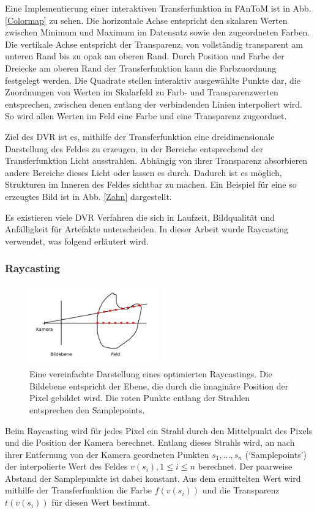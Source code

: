 \documentclass[a4paper,fontsize=12pt,toc=bib,halfparskip]{scrartcl}
\begin{document}
Eine Implementierung einer interaktiven Transferfunktion in FAnToM ist in Abb. \ref{Colormap} zu sehen. Die horizontale Achse entspricht den skalaren Werten zwischen Minimum und Maximum im Datensatz sowie den zugeordneten Farben. Die vertikale Achse entspricht der Transparenz, von vollst\"andig transparent am unteren Rand bis zu opak am oberen Rand. Durch Position und Farbe der Dreiecke am oberen Rand der Transferfunktion kann die Farbzuordnung festgelegt werden. Die Quadrate stellen interaktiv ausgew\"ahlte Punkte dar, die Zuordnungen von Werten im Skalarfeld zu Farb- und Transparenzwerten entsprechen, zwischen denen entlang der verbindenden Linien interpoliert wird. So wird allen Werten im Feld eine Farbe und eine Transparenz zugeordnet. 

Ziel des DVR ist es, mithilfe der Transferfunktion eine dreidimensionale Darstellung des Feldes zu erzeugen, in der Bereiche entsprechend der Transferfunktion Licht ausstrahlen. Abh\"angig von ihrer Transparenz absorbieren andere Bereiche dieses Licht oder lassen es durch. Dadurch ist es m\"oglich, Strukturen im Inneren des Feldes sichtbar zu machen. Ein Beispiel f\"ur eine so erzeugtes Bild ist in Abb. \ref{Zahn} dargestellt.

Es existieren viele DVR Verfahren die sich in Laufzeit, Bildqualit\"at und Anf\"alligkeit f\"ur Artefakte unterscheiden. In dieser Arbeit wurde Raycasting verwendet, was folgend erl\"autert wird.

\subsubsection{Raycasting}
\label{sec:Raycasting}
\begin{figure}
	\centering
	\includegraphics[width=0.5\textwidth]{pictures/Raycasting}
	\caption{Eine vereinfachte Darstellung eines optimierten Raycastings. Die Bildebene entspricht der Ebene, die durch die imagin\"are Position der Pixel gebildet wird. Die roten Punkte entlang der Strahlen entsprechen den Samplepoints.}
	\label{Raycasting}
\end{figure}
Beim Raycasting wird f\"ur jedes Pixel ein Strahl durch den Mittelpunkt des Pixels und die Position der Kamera berechnet. Entlang dieses Strahls wird, an nach ihrer Entfernung von der Kamera geordneten Punkten  $s_1, \dots, s_n$ (`Samplepoints') der interpolierte Wert des Feldes $v(s_i), 1\leq i\leq n$ berechnet. Der paarweise Abstand der Samplepunkte ist dabei konstant. Aus dem ermittelten Wert wird mithilfe der Transferfunktion die Farbe $f(v(s_i))$ und die Transparenz $t(v(s_i))$ f\"ur diesen Wert bestimmt.
\end{document}

